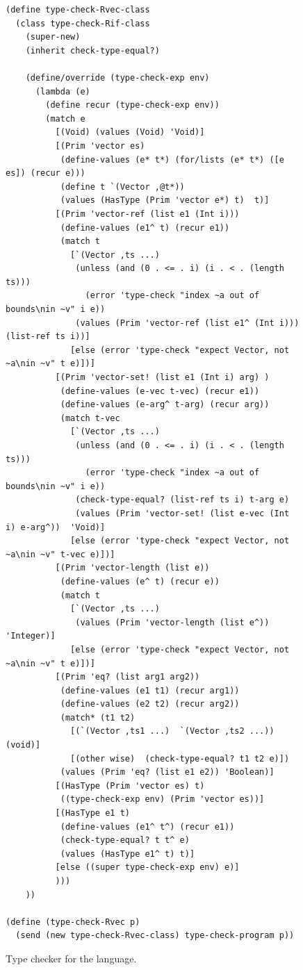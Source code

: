 \documentclass[11pt]{book}
\begin{document}
\begin{figure}[tp]
\begin{lstlisting}[basicstyle=\ttfamily\scriptsize]
(define type-check-Rvec-class
  (class type-check-Rif-class
    (super-new)
    (inherit check-type-equal?)

    (define/override (type-check-exp env)
      (lambda (e)
        (define recur (type-check-exp env))
        (match e
          [(Void) (values (Void) 'Void)]
          [(Prim 'vector es)
           (define-values (e* t*) (for/lists (e* t*) ([e es]) (recur e)))
           (define t `(Vector ,@t*))
           (values (HasType (Prim 'vector e*) t)  t)]
          [(Prim 'vector-ref (list e1 (Int i)))
           (define-values (e1^ t) (recur e1))
           (match t
             [`(Vector ,ts ...)
              (unless (and (0 . <= . i) (i . < . (length ts)))
                (error 'type-check "index ~a out of bounds\nin ~v" i e))
              (values (Prim 'vector-ref (list e1^ (Int i)))  (list-ref ts i))]
             [else (error 'type-check "expect Vector, not ~a\nin ~v" t e)])]
          [(Prim 'vector-set! (list e1 (Int i) arg) )
           (define-values (e-vec t-vec) (recur e1))
           (define-values (e-arg^ t-arg) (recur arg))
           (match t-vec
             [`(Vector ,ts ...)
              (unless (and (0 . <= . i) (i . < . (length ts)))
                (error 'type-check "index ~a out of bounds\nin ~v" i e))
              (check-type-equal? (list-ref ts i) t-arg e)
              (values (Prim 'vector-set! (list e-vec (Int i) e-arg^))  'Void)]
             [else (error 'type-check "expect Vector, not ~a\nin ~v" t-vec e)])]
          [(Prim 'vector-length (list e))
           (define-values (e^ t) (recur e))
           (match t
             [`(Vector ,ts ...)
              (values (Prim 'vector-length (list e^))  'Integer)]
             [else (error 'type-check "expect Vector, not ~a\nin ~v" t e)])]
          [(Prim 'eq? (list arg1 arg2))
           (define-values (e1 t1) (recur arg1))
           (define-values (e2 t2) (recur arg2))
           (match* (t1 t2)
             [(`(Vector ,ts1 ...)  `(Vector ,ts2 ...))  (void)]
             [(other wise)  (check-type-equal? t1 t2 e)])
           (values (Prim 'eq? (list e1 e2)) 'Boolean)]
          [(HasType (Prim 'vector es) t)
           ((type-check-exp env) (Prim 'vector es))]
          [(HasType e1 t)
           (define-values (e1^ t^) (recur e1))
           (check-type-equal? t t^ e)
           (values (HasType e1^ t) t)]
          [else ((super type-check-exp env) e)]
          )))
    ))

(define (type-check-Rvec p)
  (send (new type-check-Rvec-class) type-check-program p))
\end{lstlisting}
\caption{Type checker for the \LangVec{} language.}
\label{fig:type-check-Rvec}
\end{figure}
\end{document}
